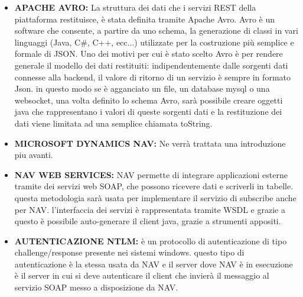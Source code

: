 \begin{itemize}
	\item \textbf{APACHE AVRO:} La struttura dei dati che i servizi REST della piattaforma restituisce, è stata definita tramite Apache Avro. Avro è un software che consente, a partire da uno schema, la generazione di classi in vari linguaggi (Java, C\#, C++, ecc...) utilizzate per la costruzione più semplice e formale di JSON. Uno dei motivi per cui è stato scelto Avro è per rendere generale il modello dei dati restituiti: indipendentemente dalle sorgenti dati connesse alla backend, il valore di ritorno di un servizio è sempre in formato Json. in questo modo se è agganciato un file, un database mysql o una websocket, una volta definito lo schema Avro, sarà possibile creare oggetti java che rappresentano i valori di queste sorgenti dati e la restituzione dei dati viene limitata ad una semplice chiamata toString.
	\item \textbf{MICROSOFT DYNAMICS NAV:} Ne verrà trattata una introduzione piu avanti.
	\item \textbf{NAV WEB SERVICES:} NAV permette di integrare applicazioni esterne tramite dei servizi web SOAP, che possono ricevere dati e scriverli in tabelle. questa metodologia sarà usata per implementare il servizio di subscribe anche per NAV. l’interfaccia dei servizi è rappresentata tramite WSDL e grazie a questo è possibile auto-generare il client java, grazie a strumenti appositi.
	\item \textbf{AUTENTICAZIONE NTLM:} è un protocollo di autenticazione di tipo challenge/response presente nei sistemi windows. questo tipo di autenticazione è la stessa usata da NAV e il server dove NAV è in esecuzione è il server in cui si deve autenticare il client che invierà il messaggio al servizio SOAP messo a disposizione da NAV.
\end{itemize}
\clearpage
